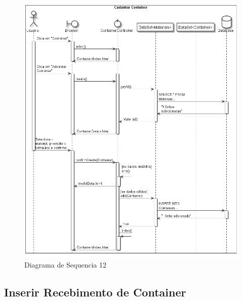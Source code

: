 \documentclass[rascunho,xindy,acronym,symbols]{fei}
\begin{document}
\begin{figure}[H]
    \centering
    \includegraphics[width=\textwidth]{./Images/DS_Cadastrar_Container.jpg}
    \caption{Diagrama de Sequencia 12}
    \label{fig:diag_seq12}
\end{figure}

\subsection{Inserir Recebimento de Container}
\end{document}
